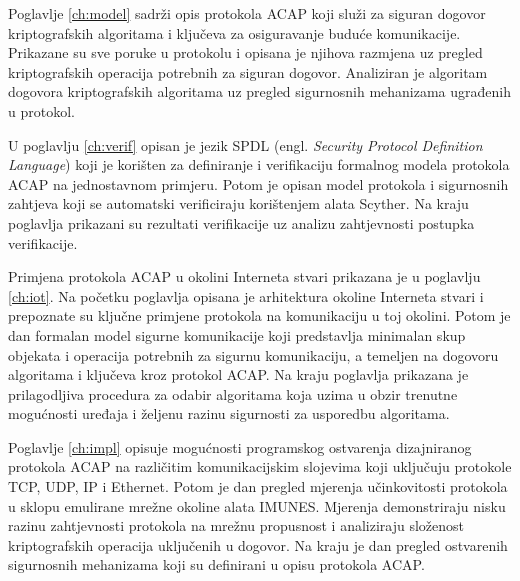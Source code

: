 Poglavlje \ref{ch:model} sadrži opis protokola ACAP koji služi za siguran
dogovor kriptografskih algoritama i ključeva za osiguravanje buduće
komunikacije. Prikazane su sve poruke u protokolu i opisana je njihova razmjena
uz pregled kriptografskih operacija potrebnih za siguran dogovor. Analiziran je
algoritam dogovora kriptografskih algoritama uz pregled sigurnosnih mehanizama
ugrađenih u protokol.

U poglavlju \ref{ch:verif} opisan je jezik SPDL (engl. \emph{Security Protocol
Definition Language}) koji je korišten za
definiranje i verifikaciju formalnog modela protokola ACAP na jednostavnom
primjeru. Potom je opisan model protokola i sigurnosnih zahtjeva koji se
automatski verificiraju korištenjem alata Scyther. Na kraju poglavlja prikazani su
rezultati verifikacije uz analizu zahtjevnosti postupka verifikacije.

Primjena protokola ACAP u okolini Interneta stvari prikazana je u poglavlju
\ref{ch:iot}. Na početku poglavlja opisana je arhitektura okoline Interneta
stvari i prepoznate su ključne primjene protokola na komunikaciju u toj
okolini. Potom je dan formalan model sigurne komunikacije koji predstavlja
minimalan skup objekata i operacija potrebnih za sigurnu komunikaciju, a
temeljen na dogovoru algoritama i ključeva kroz protokol ACAP. Na kraju
poglavlja prikazana je prilagodljiva procedura za odabir algoritama koja uzima
u obzir trenutne mogućnosti uređaja i željenu razinu sigurnosti za usporedbu
algoritama.

Poglavlje \ref{ch:impl} opisuje mogućnosti programskog ostvarenja
dizajniranog protokola ACAP na različitim komunikacijskim slojevima
koji uključuju protokole TCP, UDP, IP i Ethernet. Potom je dan pregled mjerenja
učinkovitosti protokola u sklopu emulirane mrežne okoline alata IMUNES. Mjerenja
demonstriraju nisku razinu zahtjevnosti protokola na mrežnu propusnost i
analiziraju složenost kriptografskih operacija uključenih u dogovor. Na kraju je
dan pregled ostvarenih sigurnosnih mehanizama koji su definirani u opisu
protokola ACAP.

